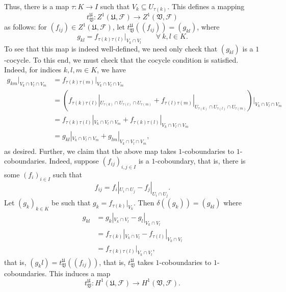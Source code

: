 \documentclass[10pt]{article}
\theoremstyle{thmstyle}
\theoremstyle{defstyle}
\newcommand{\frakU}{\mathfrak{U}}
\newcommand{\frakV}{\mathfrak{V}}
\newcommand{\scrF}{\mathscr{F}}
\begin{document}
Thus, there is a map $\tau: K\to I$ such that $V_k\subseteq U_{\tau(k)}$. This defines a mapping 
\begin{equation*}
    t^{\frakU}_{\frakV}: Z^1(\frakU,\scrF)\to Z^1(\frakV,\scrF)
\end{equation*}
as follows: for $(f_{ij})\in Z^1(\frakU,\scrF)$, let $t^{\frakU}_{\frakV}\left((f_{ij})\right) = (g_{kl})$, where 
\begin{equation*}
    g_{kl} = f_{\tau(k)\tau(l)}|_{V_k\cap V_l}\qquad\forall~k, l\in K.
\end{equation*}
To see that this map is indeed well-defined, we need only check that $(g_{kl})$ is a $1$-cocycle. To this end, we must check that the cocycle condition is satisfied. Indeed, for indices $k,l,m\in K$, we have 
\begin{align*}
    g_{km}|_{V_k\cap V_l\cap V_m} &= f_{\tau(k)\tau(m)}|_{V_k\cap V_l\cap V_m}\\
    &= \left(f_{\tau(k)\tau(l)}|_{U_{\tau(k)}\cap U_{\tau(l)}\cap U_{\tau(m)}} + f_{\tau(l)\tau(m)}|_{U_{\tau(k)}\cap U_{\tau(l)}\cap U_{\tau(m)}}\right)|_{V_k\cap V_l\cap V_m}\\
    &= f_{\tau(k)\tau(l)}|_{V_k\cap V_l\cap V_m} + f_{\tau(k)\tau(l)}|_{V_k\cap V_l\cap V_m}\\
    &= g_{kl}|_{V_k\cap V_l\cap V_m} + g_{lm}|_{V_k\cap V_l\cap V_m},
\end{align*}
as desired. Further, we claim that the above map takes $1$-coboundaries to $1$-coboundaries. Indeed, suppose $(f_{ij})_{i,j\in I}$ is a $1$-coboundary, that is, there is some $(f_i)_{i\in I}$ such that 
\begin{equation*}
    f_{ij} = f_i|_{U_i\cap U_j} - f_j|_{U_i\cap U_j}.
\end{equation*}
Let $(g_k)_{k\in K}$ be such that $g_k = f_{\tau(k)}|_{V_k}$. Then $\delta\left((g_k)\right) = (g_{kl})$ where 
\begin{align*}
    g_{kl} &= g_k|_{V_k\cap V_l} - g_l|_{V_k\cap V_l}\\
    &= f_{\tau(k)}|_{V_k\cap V_l} - f_{\tau(l)}|_{V_k\cap V_l}\\
    &= f_{\tau(k)\tau(l)}|_{V_k\cap V_l},
\end{align*}
that is, $(g_kl) = t^{\frakU}_{\frakV}\left((f_{ij})\right)$, that is, $t^{\frakU}_{\frakV}$ takes $1$-coboundaries to $1$-coboundaries. This induces a map 
\begin{equation*}
    t^{\frakU}_{\frakV}: H^1(\frakU,\scrF)\to H^1(\frakV,\scrF).
\end{equation*}
\end{document}
